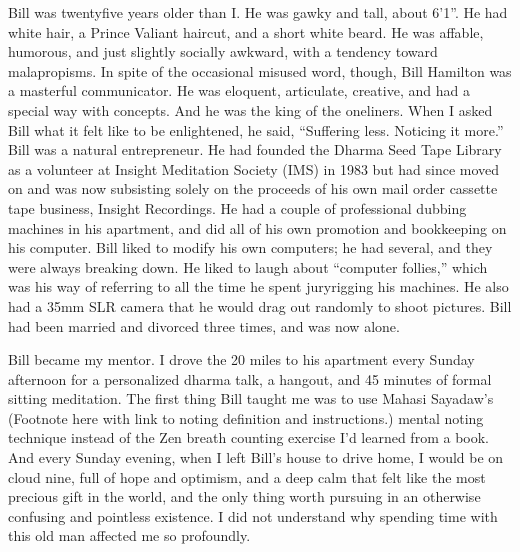 \documentclass[a5paper,10pt,english]{book}
\begin{document}
\sphinxAtStartPar
Bill was twenty\sphinxhyphen{}five years older than I. He was gawky and tall, about
6’1”. He had white hair, a Prince Valiant haircut, and a short white
beard. He was affable, humorous, and just slightly socially awkward,
with a tendency toward malapropisms. In spite of the occasional mis\sphinxhyphen{}used
word, though, Bill Hamilton was a masterful communicator. He was
eloquent, articulate, creative, and had a special way with concepts. And
he was the king of the one\sphinxhyphen{}liners. When I asked Bill what it felt like
to be enlightened, he said, “Suffering less. Noticing it more.” Bill was
a natural entrepreneur. He had founded the Dharma Seed Tape Library as a
volunteer at Insight Meditation Society (IMS) in 1983 but had since
moved on and was now subsisting solely on the proceeds of his own mail
order cassette tape business, Insight Recordings. He had a couple of
professional dubbing machines in his apartment, and did all of his own
promotion and bookkeeping on his computer. Bill liked to modify his own
computers; he had several, and they were always breaking down. He liked
to laugh about “computer follies,” which was his way of referring to all
the time he spent jury\sphinxhyphen{}rigging his machines. He also had a 35mm SLR
camera that he would drag out randomly to shoot pictures. Bill had been
married and divorced three times, and was now alone.

\sphinxAtStartPar
Bill became my mentor. I drove the 20 miles to his apartment every
Sunday afternoon for a personalized dharma talk, a hangout, and 45
minutes of formal sitting meditation. The first thing Bill taught me was
to use Mahasi Sayadaw’s (Footnote here with link to noting definition
and instructions.) mental noting technique instead of the Zen breath
counting exercise I’d learned from a book. And every Sunday evening,
when I left Bill’s house to drive home, I would be on cloud nine, full
of hope and optimism, and a deep calm that felt like the most precious
gift in the world, and the only thing worth pursuing in an otherwise
confusing and pointless existence. I did not understand why spending
time with this old man affected me so profoundly.
\end{document}
